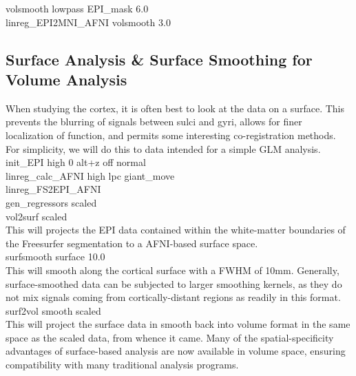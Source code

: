 \documentclass[final,titlepage,letterpaper,oneside,12pt]{article}
\renewcommand{\texttt}[2][BrickRed]{\textcolor{#1}{\ttfamily #2}}%
\begin{document}
\noindent
\texttt{volsmooth lowpass EPI\_mask 6.0} \\
\texttt{linreg\_EPI2MNI\_AFNI volsmooth 3.0} \\

\subsection{Surface Analysis \& Surface Smoothing for Volume Analysis}

When studying the cortex, it is often best to look at the data on a surface. This prevents the blurring of signals between sulci and gyri, allows for finer localization of function, and permits some interesting co-registration methods. For simplicity, we will do this to data intended for a simple GLM analysis. \\

\noindent
\texttt{init\_EPI high 0 alt+z off normal} \\
\texttt{linreg\_calc\_AFNI high lpc giant\_move} \\
\texttt{linreg\_FS2EPI\_AFNI} \\
\texttt{gen\_regressors scaled} \\

\noindent
\texttt{vol2surf scaled} \\

This will projects the EPI data contained within the white-matter boundaries of the Freesurfer segmentation to a AFNI-based surface space. \\

\noindent
\texttt{surfsmooth surface 10.0} \\

This will smooth along the cortical surface with a FWHM of 10mm. Generally, surface-smoothed data can be subjected to larger smoothing kernels, as they do not mix signals coming from cortically-distant regions as readily in this format. \\

\noindent
\texttt{surf2vol smooth scaled} \\

This will project the surface data in smooth back into volume format in the same space as the scaled data, from whence it came. Many of the spatial-specificity advantages of surface-based analysis are now available in volume space, ensuring compatibility with many traditional analysis programs.

\end{document}
